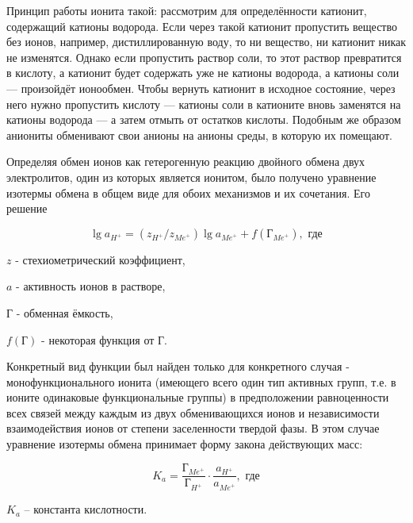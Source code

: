 \documentclass[a4paper,12pt]{article} %
\begin{document}
Принцип работы ионита такой: рассмотрим для определённости катионит, содержащий катионы водорода. Если через такой катионит пропустить вещество без ионов, например, дистиллированную воду, то ни вещество, ни катионит никак не изменятся. Однако если пропустить раствор соли, то этот раствор превратится в кислоту, а катионит будет содержать уже не катионы водорода, а катионы соли — произойдёт ионообмен. Чтобы вернуть катионит в исходное состояние, через него нужно пропустить кислоту — катионы соли в катионите вновь заменятся на катионы водорода — а затем отмыть от остатков кислоты. Подобным же образом аниониты обменивают свои анионы на анионы среды, в которую их помещают.

Определяя обмен ионов как гетерогенную реакцию двойного обмена двух электролитов, один из
которых является ионитом, было получено уравнение изотермы обмена в общем виде для обоих механизмов и их
сочетания. Его решение 

\begin{equation}
    \lg\textit{a}_{{H}^{+}} = (z_{{H}^{+}} / \textit{z}_{{Me}^{+}}) \lg\textit{a}_{{Me}^{+}} + f(\textit{Г}_{{Me}^{+}}),  \textrm{ где} 
\end{equation}

\hspace{1 cm}$z$ - стехиометрический коэффициент,

\hspace{1 cm}$a$ - активность ионов в растворе, 

\hspace{1 cm}$\textit{Г}$ - обменная ёмкость,

\hspace{1 cm}$f(\textit{Г})$ - некоторая функция от $\textit{Г}$.

Конкретный вид функции был найден только для конкретного случая - монофункционального ионита (имеющего всего один тип активных групп, т.е. в ионите одинаковые функциональные группы) в предположении равноценности всех связей между каждым из двух обменивающихся ионов и независимости взаимодействия ионов от степени заселенности твердой фазы. В этом случае уравнение изотермы обмена
принимает форму закона действующих масс:

\begin{equation}
    K_a = \frac{\textit{Г}_{{Me}^{+}}}{\textit{Г}_{{H}^{+}}} \cdot \frac{\textit{a}_{{H}^{+}}}{\textit{a}_{{Me}^{+}}},  \textrm{ где}
\end{equation}

\hspace{1 cm}$K_a$ – константа кислотности.
\end{document}
